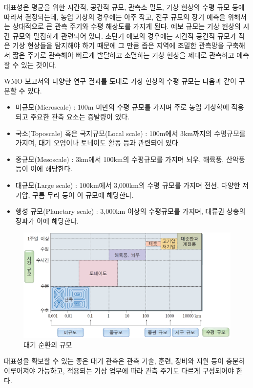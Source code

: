대표성은 평균을 위한 시간적, 공간적 규모, 관측소 밀도, 기상 현상의 수평 규모 등에 따라서 결정되는데, 농업 기상의 경우에는 아주 작고, 전구 규모의 장기 예측을 위해서는 상대적으로 큰 관측 주기와 수평 해상도를 가지게 된다. 예보 규모는 기상 현상의 시간 규모와 밀접하게 관련되어 있다. 초단기 예보의 경우에는 시간적 공간적 규모가 작은 기상 현상들을 탐지해야 하기 때문에 그 만큼 좁은 지역에 조밀한 관측망을 구축해서 짧은 주기로 관측해야 빠르게 발달하고 소멸하는 기상 현상을 제대로 관측하고 예측할 수 있는 것이다. 

WMO 보고서와 다양한 연구 결과를 토대로 기상 현상의 수평 규모는 다음과 같이 구분할 수 있다.
\begin{itemize}
	\item 미규모(Microscale) : 100m 미만의 수평 규모를 가지며 주로 농업 기상학에 적용되고 주요한 관측 요소는 증발량이 있다.
	\item 국소(Toposcale) 혹은 국지규모(Local scale) : 100m에서 3km까지의 수평규모를 가지며, 대기 오염이나 토네이도 활동 등과 관련되어 있다.
	\item 중규모(Mesoscale) : 3km에서 100km의 수평규모를 가지며 뇌우, 해륙풍, 산악풍 등이 이에 해당한다.
	\item 대규모(Large scale) : 100km에서 3,000km의 수평 규모를 가지며 전선, 다양한 저기압, 구름 무리 등이 이 규모에 해당한다.
	\item 행성 규모(Planetary scale) : 3,000km 이상의 수평규모를 가지며, 대류권 상층의 장파가 이에 해당한다.
\end{itemize}

\begin{figure}
	\centering
	\includegraphics[width=0.8\linewidth]{21observing/images/C-E-o3O-F0-0301-00026-02}
	\caption{대기 순환의 규모}
	\label{fig:c-e-o3o-f0-0301-00026-02}
\end{figure}

대표성을 확보할 수 있는 좋은 대기 관측은 관측 기술, 훈련, 장비와 지원 등이 충분히 이루어져야 가능하고, 적용되는 기상 업무에 따라 관측 주기도 다르게 구성되어야 한다.


